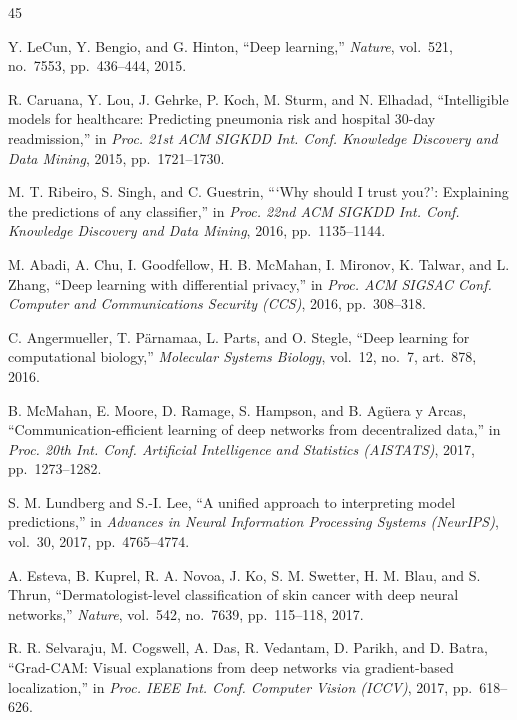 \documentclass[11pt,a4paper]{article}
\begin{document}
\begin{thebibliography}{45}
\small

 Y. LeCun, Y. Bengio, and G. Hinton, ``Deep learning,''
\emph{Nature}, vol.~521, no.~7553, pp.~436--444, 2015.

 R. Caruana, Y. Lou, J. Gehrke, P. Koch, M. Sturm, and N. Elhadad,
``Intelligible models for healthcare: Predicting pneumonia risk and hospital
30-day readmission,'' in \emph{Proc. 21st ACM SIGKDD Int. Conf. Knowledge
Discovery and Data Mining}, 2015, pp.~1721--1730.

 M. T. Ribeiro, S. Singh, and C. Guestrin, ```Why should I trust
you?': Explaining the predictions of any classifier,'' in \emph{Proc. 22nd ACM
SIGKDD Int. Conf. Knowledge Discovery and Data Mining}, 2016, pp.~1135--1144.

 M. Abadi, A. Chu, I. Goodfellow, H. B. McMahan, I. Mironov,
K. Talwar, and L. Zhang, ``Deep learning with differential privacy,'' in
\emph{Proc. ACM SIGSAC Conf. Computer and Communications Security (CCS)}, 2016,
pp.~308--318.

 C. Angermueller, T. P\"arnamaa, L. Parts, and O. Stegle, ``Deep
learning for computational biology,'' \emph{Molecular Systems Biology}, vol.~12,
no.~7, art.~878, 2016.

 B. McMahan, E. Moore, D. Ramage, S. Hampson, and B. Ag\"uera y
Arcas, ``Communication-efficient learning of deep networks from decentralized
data,'' in \emph{Proc. 20th Int. Conf. Artificial Intelligence and Statistics
(AISTATS)}, 2017, pp.~1273--1282.

 S. M. Lundberg and S.-I. Lee, ``A unified approach to
interpreting model predictions,'' in \emph{Advances in Neural Information
Processing Systems (NeurIPS)}, vol.~30, 2017, pp.~4765--4774.

 A. Esteva, B. Kuprel, R. A. Novoa, J. Ko, S. M. Swetter,
H. M. Blau, and S. Thrun, ``Dermatologist-level classification of skin cancer
with deep neural networks,'' \emph{Nature}, vol.~542, no.~7639, pp.~115--118,
2017.

 R. R. Selvaraju, M. Cogswell, A. Das, R. Vedantam, D. Parikh, and
D. Batra, ``Grad-CAM: Visual explanations from deep networks via gradient-based
localization,'' in \emph{Proc. IEEE Int. Conf. Computer Vision (ICCV)}, 2017,
pp.~618--626.


\end{thebibliography}
\end{document}
